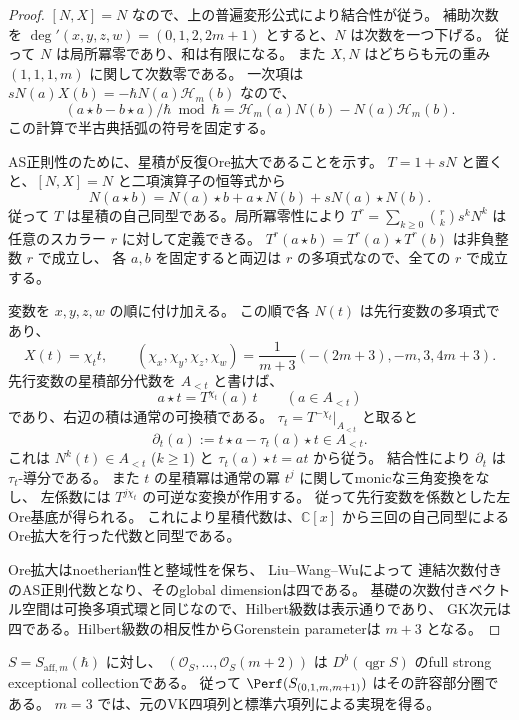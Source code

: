\begin{proof}
$[N,X]=N$ なので、上の普遍変形公式により結合性が従う。
補助次数を $\deg'(x,y,z,w)=(0,1,2,2m+1)$ とすると、$N$ は次数を一つ下げる。
従って $N$ は局所冪零であり、和は有限になる。
また $X,N$ はどちらも元の重み $(1,1,1,m)$ に関して次数零である。
一次項は $sN(a)X(b)=-\hbar N(a)\mathcal H_m(b)$ なので、
\[
 (a\star b-b\star a)/\hbar\bmod\hbar
 =\mathcal H_m(a)N(b)-N(a)\mathcal H_m(b).
\]
この計算で半古典括弧の符号を固定する。

AS正則性のために、星積が反復Ore拡大であることを示す。
$T=1+sN$ と置くと、$[N,X]=N$ と二項演算子の恒等式から
\[
 N(a\star b)=N(a)\star b+a\star N(b)+sN(a)\star N(b).
\]
従って $T$ は星積の自己同型である。局所冪零性により
$T^r=\sum_{k\ge0}\binom r k s^kN^k$ は任意のスカラー $r$ に対して定義できる。
$T^r(a\star b)=T^r(a)\star T^r(b)$ は非負整数 $r$ で成立し、
各 $a,b$ を固定すると両辺は $r$ の多項式なので、全ての $r$ で成立する。

変数を $x,y,z,w$ の順に付け加える。
この順で各 $N(t)$ は先行変数の多項式であり、
\[
 X(t)=\chi_t t,
 \qquad(\chi_x,\chi_y,\chi_z,\chi_w)
 =\frac1{m+3}\left(-(2m+3),-m,3,4m+3\right).
\]
先行変数の星積部分代数を $A_{<t}$ と書けば、
\[
 a\star t=T^{\chi_t}(a)\,t\qquad(a\in A_{<t})
\]
であり、右辺の積は通常の可換積である。
$\tau_t=T^{-\chi_t}|_{A_{<t}}$ と取ると
\[
 \partial_t(a):=t\star a-\tau_t(a)\star t\in A_{<t}.
\]
これは $N^k(t)\in A_{<t}$ ($k\ge1$) と
$\tau_t(a)\star t=at$ から従う。
結合性により $\partial_t$ は $\tau_t$-導分である。
また $t$ の星積冪は通常の冪 $t^j$ に関してmonicな三角変換をなし、
左係数には $T^{j\chi_t}$ の可逆な変換が作用する。
従って先行変数を係数とした左Ore基底が得られる。
これにより星積代数は、$\mathbb C[x]$ から三回の自己同型による
Ore拡大を行った代数と同型である。

Ore拡大はnoetherian性と整域性を保ち、
Liu--Wang--Wu\cite[Theorem 3.3 and Lemma 1.3]{LWW}によって
連結次数付きのAS正則代数となり、そのglobal dimensionは四である。
基礎の次数付きベクトル空間は可換多項式環と同じなので、Hilbert級数は表示通りであり、
GK次元は四である。Hilbert級数の相反性からGorenstein parameterは $m+3$ となる。
\end{proof}

\begin{corollary}[標準例外列と四対象の許容成分]
\label{cor:tangent-six-v33}
$S=S_{\mathrm{aff},m}(\hbar)$ に対し、
$(\mathcal O_S,\ldots,\mathcal O_S(m+2))$ は
$D^b(\operatorname{qgr}S)$ のfull strong exceptional collectionである。
従って $\Perf(S_{(0,1,m,m+1)})$ はその許容部分圏である。
$m=3$ では、元のVK四項列と標準六項列による実現を得る。
\end{corollary}

